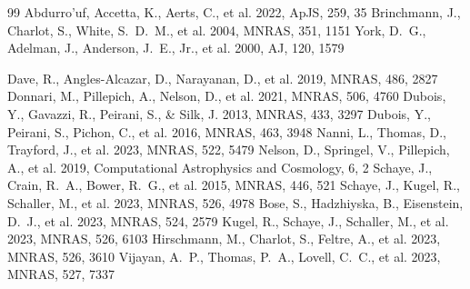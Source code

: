 \documentclass[twocolumn]{aastex702}
\begin{document}
\begin{thebibliography}{99}
 Abdurro'uf, Accetta, K., Aerts, C., et al. 2022, ApJS, 259, 35
 Brinchmann, J., Charlot, S., White, S.~D.~M., et al. 2004, MNRAS, 351, 1151
 York, D.~G., Adelman, J., Anderson, J.~E., Jr., et al. 2000, AJ, 120, 1579

 Dave, R., Angles-Alcazar, D., Narayanan, D., et al. 2019, MNRAS, 486, 2827
 Donnari, M., Pillepich, A., Nelson, D., et al. 2021, MNRAS, 506, 4760
 Dubois, Y., Gavazzi, R., Peirani, S., \& Silk, J. 2013, MNRAS, 433, 3297
 Dubois, Y., Peirani, S., Pichon, C., et al. 2016, MNRAS, 463, 3948
 Nanni, L., Thomas, D., Trayford, J., et al. 2023, MNRAS, 522, 5479
 Nelson, D., Springel, V., Pillepich, A., et al. 2019, Computational Astrophysics and Cosmology, 6, 2
 Schaye, J., Crain, R.~A., Bower, R.~G., et al. 2015, MNRAS, 446, 521
 Schaye, J., Kugel, R., Schaller, M., et al. 2023, MNRAS, 526, 4978
 Bose, S., Hadzhiyska, B., Eisenstein, D.~J., et al. 2023, MNRAS, 524, 2579
 Kugel, R., Schaye, J., Schaller, M., et al. 2023, MNRAS, 526, 6103
 Hirschmann, M., Charlot, S., Feltre, A., et al. 2023, MNRAS, 526, 3610
 Vijayan, A.~P., Thomas, P.~A., Lovell, C.~C., et al. 2023, MNRAS, 527, 7337
\end{thebibliography}
\end{document}
